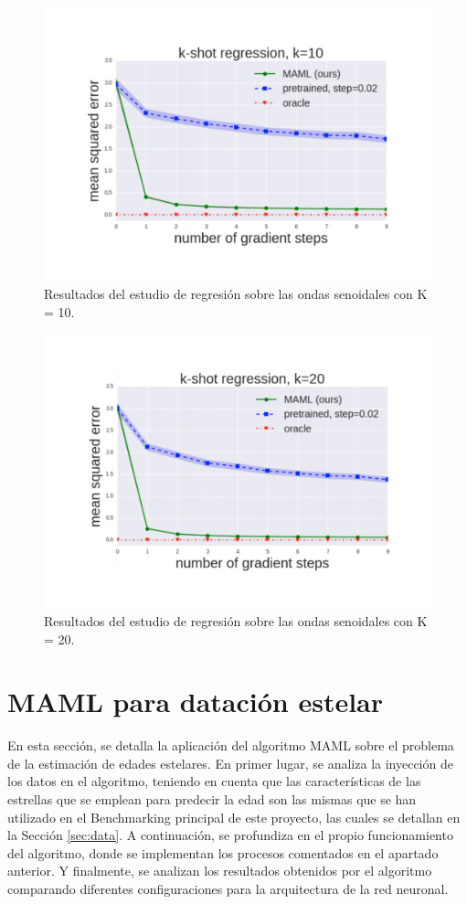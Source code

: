\begin{figure}[H]
\begin{center}
 \includegraphics[width=0.8\linewidth]{Figuras/MAML/sinusoid_2.pdf}
\end{center}
\caption{Resultados del estudio de regresión sobre las ondas senoidales con K = 10.}
 \label{fig:sinusoid_results_2}
\end{figure}

\begin{figure}[H]
\begin{center}
 \includegraphics[width=0.8\linewidth]{Figuras/MAML/sinusoid_3.pdf}
\end{center}
\caption{Resultados del estudio de regresión sobre las ondas senoidales con K = 20.}
 \label{fig:sinusoid_results_3}
\end{figure}

\section{MAML para datación estelar}
\label{sec:maml}

En esta sección, se detalla la aplicación del algoritmo MAML sobre el problema de la estimación de edades estelares. En primer lugar, se analiza la inyección de los datos en el algoritmo, teniendo en cuenta que las características de las estrellas que se emplean para predecir la edad son las mismas que se han utilizado en el Benchmarking principal de este proyecto, las cuales se detallan en la Sección \ref{sec:data}. A continuación, se profundiza en el propio funcionamiento del algoritmo, donde se implementan los procesos comentados en el apartado anterior. Y finalmente, se analizan los resultados obtenidos por el algoritmo comparando diferentes configuraciones para la arquitectura de la red neuronal.

